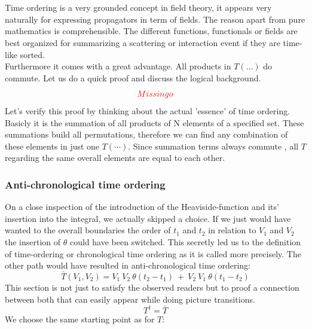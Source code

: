 \documentclass[12pt, titlepage]{article}
\begin{document}
\\\\
Time ordering is a very grounded concept in field theory, it appears very naturally for expressing propagators in term of fields. The reason apart from pure mathematics is comprehensible. The different functions, functionals or fields are best organized for summarizing a scattering or interaction event if they are time-like sorted.
\\
Furthermore it comes with a great advantage. All products in $ T(\ldots) $ do commute. Let us do a quick proof and discuss the logical background.
\begin{equation}
\textcolor{red}{Missingo}
\end{equation}
Let's verify this proof by thinking about the actual 'essence' of time ordering. Basicly it is the summation of all products of N elements of a specified set. These summations build all permutations, therefore we can find any combination of these elements in just one $ T(\cdots) $. Since summation terms always commute , all $ T $ regarding the same overall elements are equal to each other. 

\subsubsection{Anti-chronological time ordering}
On a close inspection of the introduction of the Heaviside-function and its' insertion into the integral, we actually skipped a choice. If we just would have wanted to the overall boundaries the order of $ t_1 $ and $ t_2 $ in relation to $ V_1 $ and $ V_2 $ the insertion of $  \theta$  could have been switched. This secretly led us to the definition of time-ordering or chronological time ordering as it is called more precisely. The other path would have resulted in anti-chronological time ordering:
\begin{equation}
 \bar{T}(V_1,V_2)
 =
 V_1\ V_2\ \theta (t_2 -t_1)\ +\ V_2\  V_1 \ \theta (t_1-t_2)
\end{equation} 
This section is not just to satisfy the observed readers but to proof a connection between both that can easily appear while doing picture transitions.
\\
\begin{equation}
T^{\dagger}=\bar{T}
\end{equation}
We choose the same starting point as for $ T $:
\end{document}
